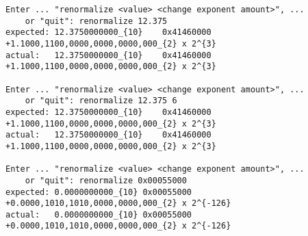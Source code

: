 \begin{verbatim}
Enter ... "renormalize <value> <change exponent amount>", ...
    or "quit": renormalize 12.375
expected: 12.3750000000_{10}	0x41460000	+1.1000,1100,0000,0000,0000,000_{2} x 2^{3}
actual:   12.3750000000_{10}	0x41460000	+1.1000,1100,0000,0000,0000,000_{2} x 2^{3}

Enter ... "renormalize <value> <change exponent amount>", ...
    or "quit": renormalize 12.375 6
expected: 12.3750000000_{10}	0x41460000	+1.1000,1100,0000,0000,0000,000_{2} x 2^{3}
actual:   12.3750000000_{10}	0x41460000	+1.1000,1100,0000,0000,0000,000_{2} x 2^{3}

Enter ... "renormalize <value> <change exponent amount>", ...
    or "quit": renormalize 0x00055000
expected: 0.0000000000_{10}	0x00055000	+0.0000,1010,1010,0000,0000,000_{2} x 2^{-126}
actual:   0.0000000000_{10}	0x00055000	+0.0000,1010,1010,0000,0000,000_{2} x 2^{-126}
\end{verbatim}